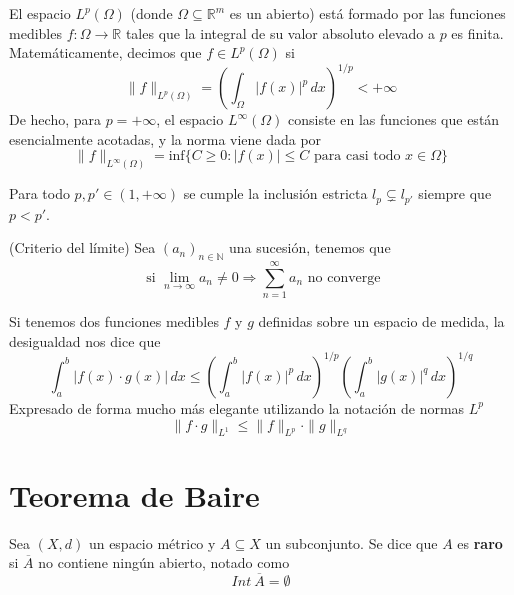 \documentclass[12pt]{book}
\begin{document}
\begin{definicion}
    El espacio $L^p(\Omega)$ (donde $\Omega \subseteq \mathbb{R}^m$ es un abierto)  está formado por las funciones medibles $f: \Omega \to \mathbb{R}$ tales que la integral de su valor absoluto elevado a $p$ es finita. Matemáticamente, decimos que $f \in L^p(\Omega)$ si
    $$\|f\|_{L^p(\Omega)} = \left( \int_{\Omega} |f(x)|^p \, dx \right)^{1/p} < +\infty$$
    De hecho, para $p = +\infty$, el espacio $L^\infty(\Omega)$ consiste en las funciones que están esencialmente acotadas, y la norma viene dada por
    $$\|f\|_{L^\infty(\Omega)} = \text{inf} \{ C \ge 0 : |f(x)| \le C \text{ para casi todo } x \in \Omega \}$$
\end{definicion}

\begin{prop}
    Para todo $p, p' \in (1, +\infty)$ se cumple la inclusión estricta $l_p \subsetneq l_{p'}$ siempre que $p < p'$.
\end{prop}

\begin{prop}(Criterio del límite)
    Sea $(a_n)_{n \in \mathbb{N}}$ una sucesión, tenemos que
    \begin{equation*}
        \text{ si } \lim_{n \to \infty} a_n \neq 0 \Longrightarrow \sum_{n=1}^\infty a_n \text{ no converge}
    \end{equation*}
\end{prop}
\begin{prop}
    Si tenemos dos funciones medibles $f$ y $g$ definidas sobre un espacio de medida, la desigualdad nos dice que
    $$\int_{a}^{b} |f(x) \cdot g(x)| \, dx \leq \left( \int_{a}^{b} |f(x)|^p \, dx \right)^{1/p} \left( \int_{a}^{b} |g(x)|^q \, dx \right)^{1/q}$$
    Expresado de forma mucho más elegante utilizando la notación de normas $L^p$
    $$\|f \cdot g\|_{L^1} \leq \|f\|_{L^p} \cdot \|g\|_{L^q}$$
\end{prop}


\section{Teorema de Baire}

\begin{definicion}
    Sea $(X, d)$ un espacio métrico y $A \subseteq X$ un subconjunto. Se dice que $A$ es \textbf{raro} si $\overline{A}$ no contiene ningún abierto, notado como
    \begin{equation*}
        Int \ \overline{A} = \emptyset
    \end{equation*}
\end{definicion}
\end{document}

